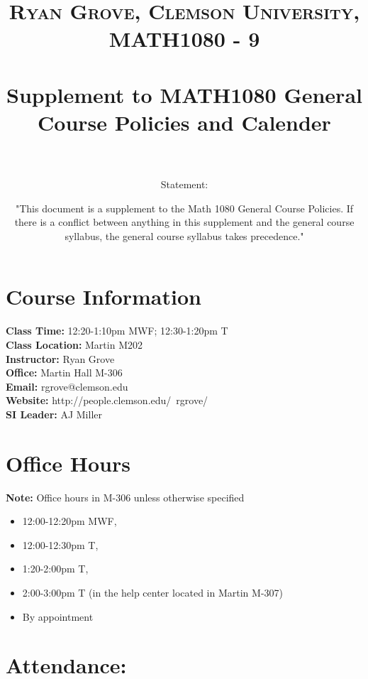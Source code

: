 \documentclass[paper=a4, fontsize=11pt]{scrartcl} %
\title{	
\normalfont \normalsize 
\textsc{Ryan Grove, Clemson University, MATH1080 - 9} \\ [25pt] %
\horrule{0.5pt} \\[0.4cm] %
\huge Supplement to MATH1080 General Course Policies and Calender \\ %
\horrule{2pt} \\[0.5cm] %
}
\author{Statement:}
\date{\normalsize "This document is a supplement to the Math
1080 General Course Policies.  If there is a conflict between anything in 
this supplement and the general course syllabus, the general course 
syllabus takes precedence."}
\numberwithin{equation}{section} %
\numberwithin{figure}{section} %
\numberwithin{table}{section} %
\begin{document}
\maketitle %


\section*{\textbf{Course Information}}

\textbf{Class Time:} 12:20-1:10pm MWF; 12:30-1:20pm T \\
\textbf{Class Location:} Martin M202 \\
\textbf{Instructor:} Ryan Grove \\
\textbf{Office:} Martin Hall M-306 \\
\textbf{Email:} rgrove@clemson.edu \\
\textbf{Website:} http://people.clemson.edu/~rgrove/ \\
\textbf{SI Leader:} AJ Miller 


\section*{\textbf{Office Hours}}

\textbf{Note:} Office hours in M-306 unless otherwise specified
\begin{itemize}
\item 12:00-12:20pm MWF, 
\item 12:00-12:30pm T, 
\item 1:20-2:00pm T, 
\item 2:00-3:00pm T (in the help center located in Martin M-307)
\item By appointment 
\end{itemize}


\section*{\textbf{Attendance:}}
\end{document}
